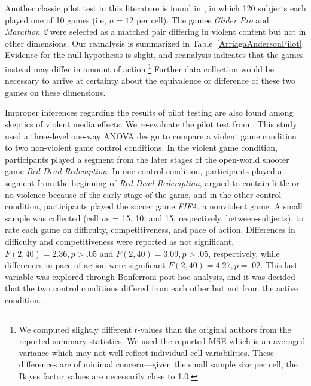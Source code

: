 \documentclass[man]{apa6}
\begin{document}
Another classic pilot test in this literature is found in \citet[study 1]{Anderson:etal:2004}, in which 120 subjects each played one of 10 games (i.e, $n = 12$ per cell). The games {\em Glider Pro} and {\em Marathon 2} were selected as a matched pair differing in violent content but not in other dimensions. Our reanalysis is summarized in Table~\ref{ArriagaAndersonPilot}. Evidence for the null hypothesis is slight, and reanalysis indicates that the games instead may differ in amount of action.\footnote{We computed slightly different $t$-values than the original authors from the reported summary statistics.  We used the reported MSE which is an averaged variance which may not well reflect individual-cell variabilities.    These differences are of minimal concern---given the small sample size per cell, the Bayes factor values are necessarily close to 1.0.} Further data collection would be necessary to arrive at certainty about the equivalence or difference of these two games on these dimensions. 

Improper inferences regarding the results of pilot testing are also found among skeptics of violent media effects. We re-evaluate the pilot test from \citet{Valadez:Ferguson:2012}. This study used a three-level one-way ANOVA design to compare a violent game condition to two non-violent game control conditions. In the violent game condition, participants played a segment from the later stages of the open-world shooter game {\em Red Dead Redemption}. In one control condition, participants played a segment from the beginning of {\em Red Dead Redemption}, argued to contain little or no violence because of the early stage of the game, and in the other control condition, participants played the soccer game {\em FIFA}, a nonviolent game. A small sample was collected (cell $n$s = 15, 10, and 15, respectively, between-subjects), to rate each game on difficulty, competitiveness, and pace of action. Differences in difficulty and competitiveness were reported as not significant, $F(2,40) = 2.36, p > .05$ and $F(2, 40) = 3.09, p > .05$, respectively, while differences in pace of action were significant $F(2, 40) = 4.27, p = .02$. This last variable was explored through Bonferroni post-hoc analysis, and it was decided that the two control conditions differed from each other but not from the active condition. 
\end{document}
